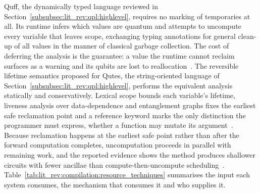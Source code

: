 Quff, the dynamically typed language reviewed in Section~\ref{subsubsec:lit_rev:qpl:highlevel}, requires no marking of temporaries at all.
Its runtime infers which values are quantum and attempts to uncompute every variable that leaves scope, exchanging typing annotations for general clean-up of all values in the manner of classical garbage collection.
The cost of deferring the analysis is the guarantee: a value the runtime cannot reclaim surfaces as a warning and its qubits are lost to reallocation~\cite{wright2024quff}.
The reversible lifetime semantics proposed for Qutes, the string-oriented language of Section~\ref{subsubsec:lit_rev:qpl:highlevel}, performs the equivalent analysis statically and conservatively.
Lexical scope bounds each variable's lifetime, liveness analysis over data-dependence and entanglement graphs fixes the earliest safe reclamation point and a reference keyword marks the only distinction the programmer must express, whether a function may mutate its argument~\cite{reversiblelifetime2026}.
Because reclamation happens at the earliest safe point rather than after the forward computation completes, uncomputation proceeds in parallel with remaining work, and the reported evidence shows the method produces shallower circuits with fewer ancillae than compute-then-uncompute scheduling~\cite{reversiblelifetime2026}.
Table~\ref{tab:lit_rev:compilation:resource_techniques} summarises the input each system consumes, the mechanism that consumes it and who supplies it.

